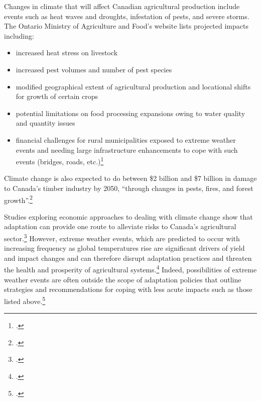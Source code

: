 Changes in climate that will affect Canadian agricultural production include events such as heat waves and droughts, infestation of pests, and severe storms.
The Ontario Ministry of Agriculture and Food's website lists projected impacts including:
\begin{itemize}
	\item increased heat stress on livestock
	\item increased pest volumes and number of pest species
	\item modified geographical extent of agricultural production and locational shifts for growth of certain crops
	\item potential limitations on food processing expansions owing to water quality and quantity issues
	\item financial challenges for rural municipalities exposed to extreme weather events and needing large infrastructure enhancements to cope with such events (bridges, roads, etc.)\footcite{OntarioCCandAg}
\end{itemize}
Climate change is also expected to do between \$2 billion and \$7 billion in damage to Canada's timber industry by 2050, ``through changes in pests, fires, and forest growth''.\footcite[][p.16]{NRTEEPrice}



Studies exploring economic approaches to dealing with climate change show that adaptation can provide one route to alleviate risks to Canada's agricultural sector.\footcite{Amiraslany2010}
However, extreme weather events, which are predicted to occur with increasing frequency as global temperatures rise are significant drivers of yield and impact changes and can therefore disrupt adaptation practices and threaten the health and prosperity of agricultural systems.\footcite{IsikDevadoss2006}
Indeed, possibilities of extreme weather events are often outside the scope of adaptation policies that outline strategies and recommendations for coping with less acute impacts such as those listed above.\footcite[See for instance:][]{Malcolm2012}



